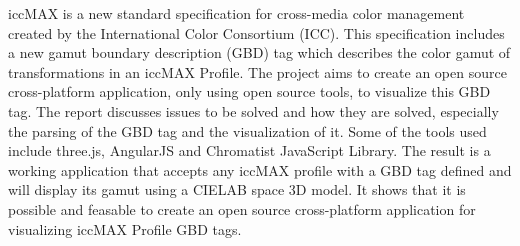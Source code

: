 iccMAX is a new standard specification for cross-media color management created by the International Color Consortium (ICC).
This specification includes a new gamut boundary description (GBD) tag which describes the color gamut of transformations in an iccMAX Profile.
The project aims to create an open source cross-platform application, only using open source tools, to visualize this GBD tag.
The report discusses issues to be solved and how they are solved, especially the parsing of the GBD tag and the visualization of it.
Some of the tools used include three.js, AngularJS and Chromatist JavaScript Library.
The result is a working application that accepts any iccMAX profile with a GBD tag defined and will display its gamut using a CIELAB space 3D model.
It shows that it is possible and feasable to create an open source cross-platform application for visualizing iccMAX Profile GBD tags.

